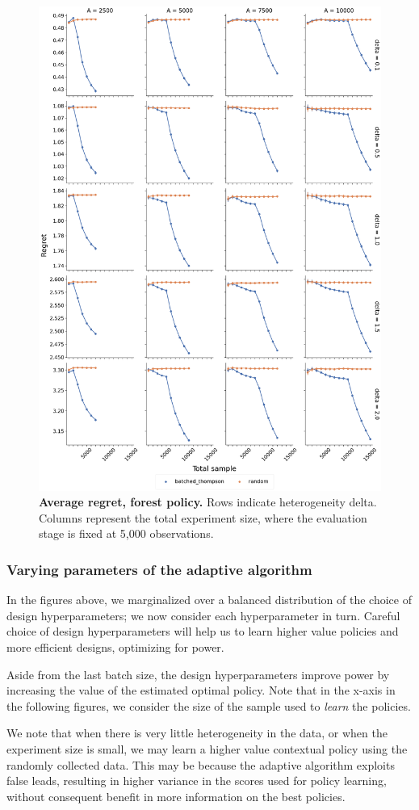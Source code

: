 \documentclass[letterpaper, 12pt, parskip=full,DIV=10]{scrartcl}
\begin{document}
\begin{figure}[ht]
\centering
\includegraphics[width=.7\textwidth]{figures/regret_overall.png}
\caption{\textbf{Average regret, forest policy.} Rows indicate heterogeneity delta. Columns represent the total experiment size, where the evaluation stage is fixed at 5,000 observations. }
\label{fig:regret}
\end{figure}\FloatBarrier


\subsubsection{Varying parameters of the adaptive algorithm}

In the figures above, we marginalized over a balanced distribution of the choice of design hyperparameters; we now consider each hyperparameter in turn. Careful choice of design hyperparameters will help us to learn higher value policies and more efficient designs, optimizing for power. 

Aside from the last batch size, the design hyperparameters improve power by increasing the value of the estimated optimal policy. Note that in the x-axis in the following figures, we consider the size of the sample used to \textit{learn} the policies. 

We note that when there is very little heterogeneity in the data, or when the experiment size is small, we may learn a higher value contextual policy using the randomly collected data. This may be because the adaptive algorithm exploits false leads, resulting in higher variance in the scores used for policy learning, without consequent benefit in more information on the best policies. %
\end{document}
